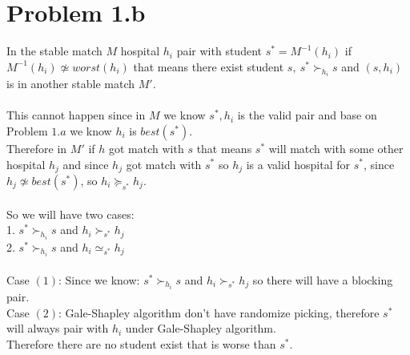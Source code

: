 \documentclass{article}
\begin{document}
\newpage
\section{Problem 1.b}
In the stable match $M$ hospital $h_i$ pair with student $s^* = M^{-1}(h_i)$ if $M^{-1}(h_i) \not \simeq worst(h_i)$ that means there exist student $s,\ s^* \succ_{h_i} s$ and $(s,h_i)$ is in another stable match $M'$.\\\\
This cannot happen since in $M$ we know $s^*,h_i$ is the valid pair and base on Problem $1.a$ we know $h_i$ is $best(s^*)$.\\
Therefore in $M'$ if $h$ got match with $s$ that means $s^*$ will match with some other hospital $h_j$ and since $h_j$ got match with $s^*$ so $h_j$ is a valid hospital for $s^*$, since $h_j \not\simeq best(s^*)$, so $h_i \succeq_{s^*} h_j$.\\\\
So we will have two cases:\\
1. $s^* \succ_{h_i} s$ and $h_i \succ_{s^*} h_j$\\
2. $s^* \succ_{h_i} s$ and $h_i \simeq_{s^*} h_j$\\\\
Case $(1)$: Since we know: $s^* \succ_{h_i} s$ and $h_i \succ_{s^*} h_j$ so there will have a blocking pair.\\
Case $(2)$: Gale-Shapley algorithm don't have randomize picking, therefore $s^*$ will always pair with $h_i$ under Gale-Shapley algorithm.\\
Therefore there are no student exist that is worse than $s^*$.


\newpage
\end{document}
